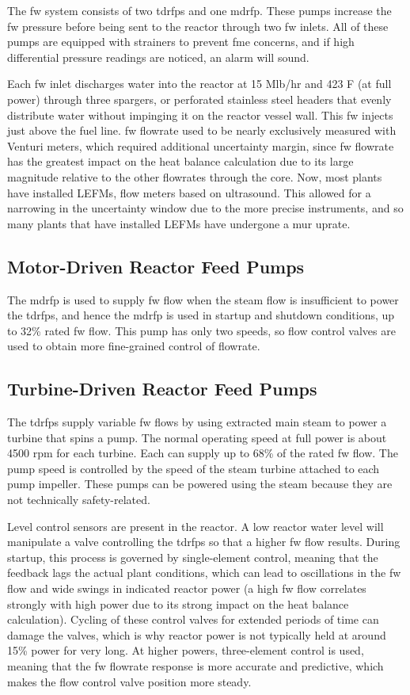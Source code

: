 \documentclass[10pt]{article}
\begin{document}
The \gls{fw} system consists of two \gls{tdrfp}s and one \gls{mdrfp}. These pumps increase the \gls{fw} pressure before being sent to the reactor through two \gls{fw} inlets. All of these pumps are equipped with strainers to prevent \gls{fme} concerns, and if high differential pressure readings are noticed, an alarm will sound.

Each \gls{fw} inlet discharges water into the reactor at 15 Mlb/hr and 423 F (at full power) through three spargers, or perforated stainless steel headers that evenly distribute water without impinging it on the reactor vessel wall. This \gls{fw} injects just above the fuel line. \gls{fw} flowrate used to be nearly exclusively measured with Venturi meters, which required additional uncertainty margin, since \gls{fw} flowrate has the greatest impact on the heat balance calculation due to its large magnitude relative to the other flowrates through the core. Now, most plants have installed LEFMs, flow meters based on ultrasound. This allowed for a narrowing in the uncertainty window due to the more precise instruments, and so many plants that have installed LEFMs have undergone a \gls{mur} uprate. 

\subsection{Motor-Driven Reactor Feed Pumps}
The \gls{mdrfp} is used to supply \gls{fw} flow when the steam flow is insufficient to power the \gls{tdrfp}s, and hence the \gls{mdrfp} is used in startup and shutdown conditions, up to 32\% rated \gls{fw} flow. This pump has only two speeds, so flow control valves are used to obtain more fine-grained control of flowrate.

\subsection{Turbine-Driven Reactor Feed Pumps}
The \gls{tdrfp}s supply variable \gls{fw} flows by using extracted main steam to power a turbine that spins a pump. The normal operating speed at full power is about 4500 rpm for each turbine. Each can supply up to 68\% of the rated \gls{fw} flow. The pump speed is controlled by the speed of the steam turbine attached to each pump impeller. These pumps can be powered using the steam because they are not technically safety-related. 

Level control sensors are present in the reactor. A low reactor water level will manipulate a valve controlling the \gls{tdrfp}s so that a higher \gls{fw} flow results. During startup, this process is governed by single-element control, meaning that the feedback lags the actual plant conditions, which can lead to oscillations in the \gls{fw} flow and wide swings in indicated reactor power (a high \gls{fw} flow correlates strongly with high power due to its strong impact on the heat balance calculation). Cycling of these control valves for extended periods of time can damage the valves, which is why reactor power is not typically held at around 15\% power for very long. At higher powers, three-element control is used, meaning that the \gls{fw} flowrate response is more accurate and predictive, which makes the flow control valve position more steady. 
\end{document}
